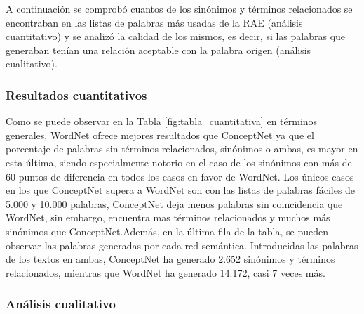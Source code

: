 A continuación se comprobó cuantos de los sinónimos y términos relacionados se encontraban en las listas de palabras más usadas de la RAE (análisis cuantitativo) y se analizó la calidad de los mismos, es decir, si las palabras que generaban tenían una relación aceptable con la palabra origen (análisis cualitativo).

\subsubsection{Resultados cuantitativos}
\label{cap:sec:pruebaCuantitativa}

Como se puede observar en la Tabla \ref{fig:tabla_cuantitativa} en términos generales, WordNet ofrece mejores resultados que ConceptNet ya que el porcentaje de palabras sin términos relacionados, sinónimos o ambas, es mayor en esta última, siendo especialmente notorio en el caso de los sinónimos con más de 60 puntos de diferencia en todos los casos en favor de WordNet. Los únicos casos en los que ConceptNet supera a WordNet son con las listas de palabras fáciles de 5.000 y 10.000 palabras, ConceptNet deja menos palabras sin coincidencia que WordNet, sin embargo, encuentra mas términos relacionados y muchos más sinónimos que ConceptNet.Además, en la última fila de la tabla, se pueden observar las palabras generadas por cada red semántica. Introducidas las palabras de los textos en ambas, ConceptNet ha generado 2.652 sinónimos y términos relacionados, mientras que WordNet ha generado 14.172, casi 7 veces más.



\subsubsection{Análisis cualitativo}
\label{sssec:pruebaCualitativa}

